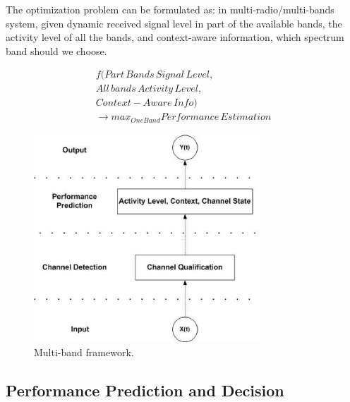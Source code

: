 
The optimization problem can be formulated as: in multi-radio/multi-bands system, given dynamic received signal level in part of the available bands, the activity level of all the bands, and context-aware information, which spectrum band should we choose. 







\begin{align}
f(Part\, Bands\, Signal\, Level,\nonumber \\
All\,bands\, Activity\,Level, \nonumber \\
Context-Aware\, Info)\nonumber \\
\rightarrow max_{One Band}{Performance\, Estimation}
\end{align}



\begin{figure}
\centering
\includegraphics[width=85mm]{figure/multiband_framework}
\caption{Multi-band framework.}
\label{fig:multiframe}
\end{figure}

\subsection{Performance Prediction and Decision}

